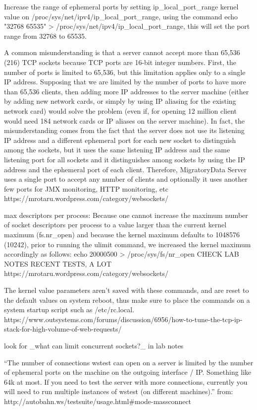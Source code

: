 \documentclass{uvamscse}
\begin{document}
Increase the range of ephemeral ports by setting ip\_local\_port\_range kernel value on /proc/sys/net/ipv4/ip\_local\_port\_range, using the command echo "32768 65535" > /proc/sys/net/ipv4/ip\_local\_port\_range, this will set the port range from 32768 to 65535.

A common misunderstanding is that a server cannot accept more than 65,536 (216) TCP sockets because TCP ports are 16-bit integer numbers.
First, the number of ports is limited to 65,536, but this limitation applies only to a single IP address. Supposing that we are limited by the number of ports to have more than 65,536 clients, then adding more IP addresses to the server machine (either by adding new network cards, or simply by using IP aliasing for the existing network card) would solve the problem (even if, for opening 12 million client would need 184 network cards or IP aliases on the server machine).
In fact, the misunderstanding comes from the fact that the server does not use its listening IP address and a different ephemeral port for each new socket to distinguish among the sockets, but it uses the same listening IP address and the same listening port for all sockets and it distinguishes among sockets by using the IP address and the ephemeral port of each client. Therefore, MigratoryData Server uses a single port to accept any number of clients and optionally it uses another few ports for JMX monitoring, HTTP monitoring, etc
https://mrotaru.wordpress.com/category/websockets/

max descriptors per process:
Because one cannot increase the maximum number of socket descriptors per process to a value larger than the current kernel maximum (fs.nr\_open) and because the kernel maximum defaults to 1048576 (10242), prior to running the ulimit command, we increased the kernel maximum accordingly as follows:
echo 20000500 > /proc/sys/fs/nr\_open
CHECK LAB NOTES RECENT TESTS, A LOT
https://mrotaru.wordpress.com/category/websockets/

The kernel value parameters aren't saved with these commands, and are reset to the default values on system reboot, thus make sure to place the commands on a system startup script such as /etc/rc.local.
https://www.outsystems.com/forums/discussion/6956/how-to-tune-the-tcp-ip-stack-for-high-volume-of-web-requests/

look for \_what can limit concurrent sockets?\_ in lab notes

“The number of connections wstest can open on a server is limited by the number of ephemeral ports on the machine on the outgoing interface / IP. Something like 64k at most. If you need to test the server with more connections, currently you will need to run multiple instances of wstest (on different machines).” from: http://autobahn.ws/testsuite/usage.html\#mode-massconnect
\end{document}
